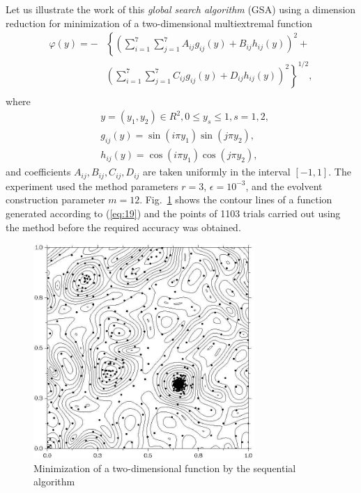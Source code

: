 \documentclass[smallcondensed]{svjour3}     %
\begin{document}
Let us illustrate the work of this \textit{global search algorithm} (GSA) using a dimension reduction for minimization of a two-dimensional multiextremal function
\begin{eqnarray} \nonumber \label{eq:19}
\varphi(y)= -&\left\{\left(\sum^{7}_{i=1}\sum^{7}_{j=1}A_{ij}g_{ij}(y)+B_{ij}h_{ij}(y)\right)^2+\right. \\
&\left.\left(\sum^{7}_{i=1}\sum^{7}_{j=1}C_{ij}g_{ij}(y)+D_{ij}h_{ij}(y)\right)^2\right\}^{1/2},\\ \nonumber
\end{eqnarray}
where
\begin{eqnarray} \nonumber
& y=(y_1,y_2)\in R^2, 0 \leq y_s \leq 1, s=1,2, \\ \nonumber
& g_{ij}(y)=\sin(i\pi y_1)\sin(j\pi y_2),  \\ \nonumber
& h_{ij}(y)=\cos(i\pi y_1)\cos(j\pi y_2), \nonumber 
\end{eqnarray}
and coefficients $A_{ij}, B_{ij}, C_{ij}, D_{ij}$  are taken uniformly in the interval $[-1,1]$. The experiment used the method parameters $r=3$, $\epsilon=10^{-3}$, and the evolvent construction parameter $m=12$. Fig.~\ref{fig:1} shows the contour lines of a function generated according to (\ref{eq:19}) and the points of 1103 trials carried out using the method before the required accuracy was obtained.
\begin{figure}
	\center
  \includegraphics[width=0.75\textwidth]{fig1.jpg} 
  \caption{Minimization of a two-dimensional function by the sequential algorithm}
  \label{fig:1}       %
\end{figure}
\end{document}
